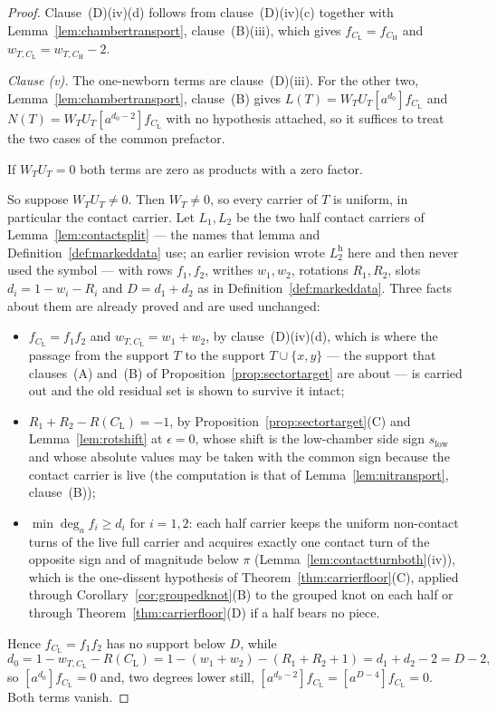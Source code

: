 \begin{proof}
Clause~(D)(iv)(d) follows from clause~(D)(iv)(c) together with Lemma~\ref{lem:chambertransport}, clause~(B)(iii), which gives
$f_{C_{\mathrm L}}=f_{C_{\mathrm H}}$ and $w_{T,C_{\mathrm L}}=w_{T,C_{\mathrm H}}-2$.


\emph{Clause (v).}
The one-newborn terms are clause~(D)(iii). For the other two,
Lemma~\ref{lem:chambertransport}, clause~(B) gives
$L(T)=W_TU_T[a^{d_0}]f_{C_{\mathrm L}}$ and $N(T)=W_TU_T[a^{d_0-2}]f_{C_{\mathrm L}}$ with no
hypothesis attached, so it suffices to treat the two cases of the common
prefactor.

If $W_TU_T=0$ both terms are zero as products with a zero factor.

So suppose $W_TU_T\neq0$. Then $W_T\neq0$, so every carrier of $T$ is uniform,
in particular the contact carrier. Let $L_1,L_2$ be the two half contact carriers of
Lemma~\ref{lem:contactsplit} --- the names that lemma and
Definition~\ref{def:markeddata} use; an earlier revision wrote
$L_2^{\mathrm h}$ here and then never used the symbol --- with rows $f_1,f_2$, writhes
$w_1,w_2$, rotations $R_1,R_2$, slots $d_i=1-w_i-R_i$ and $D=d_1+d_2$ as in
Definition~\ref{def:markeddata}. Three facts about them are already proved and
are used unchanged:
\begin{itemize}
\item $f_{C_{\mathrm L}}=f_1f_2$ and $w_{T,C_{\mathrm L}}=w_1+w_2$, by
clause~(D)(iv)(d), which is where the passage from the support
$T$ to the support $T\cup\{x,y\}$ --- the support that
clauses~(A) and~(B) of Proposition~\ref{prop:sectortarget} are about --- is
carried out and the old residual set is shown to survive it intact;
\item $R_1+R_2-R(C_{\mathrm L})=-1$, by Proposition~\ref{prop:sectortarget}(C) and
Lemma~\ref{lem:rotshift} at $\epsilon=0$, whose shift is the low-chamber side
sign $s_{\mathrm{low}}$ and whose absolute values may be taken with the common
sign because the contact carrier is live (the computation is that of
Lemma~\ref{lem:nitransport}, clause~(B));
\item $\min\deg_af_i\geq d_i$ for $i=1,2$: each half carrier keeps the uniform
non-contact turns of the live full carrier and acquires exactly one contact
turn of the opposite sign and of magnitude below $\pi$
(Lemma~\ref{lem:contactturnboth}(iv)), which is
the one-dissent hypothesis of Theorem~\ref{thm:carrierfloor}(C), applied through
Corollary~\ref{cor:groupedknot}(B) to the grouped knot on each half or through
Theorem~\ref{thm:carrierfloor}(D) if a half bears no piece.
\end{itemize}
Hence $f_{C_{\mathrm L}}=f_1f_2$ has no support below $D$, while
\[
   d_0=1-w_{T,C_{\mathrm L}}-R(C_{\mathrm L})=1-(w_1+w_2)-(R_1+R_2+1)=d_1+d_2-2=D-2 ,
\]
so $[a^{d_0}]f_{C_{\mathrm L}}=0$ and, two degrees lower still,
$[a^{d_0-2}]f_{C_{\mathrm L}}=[a^{D-4}]f_{C_{\mathrm L}}=0$. Both terms vanish.


\end{proof}
